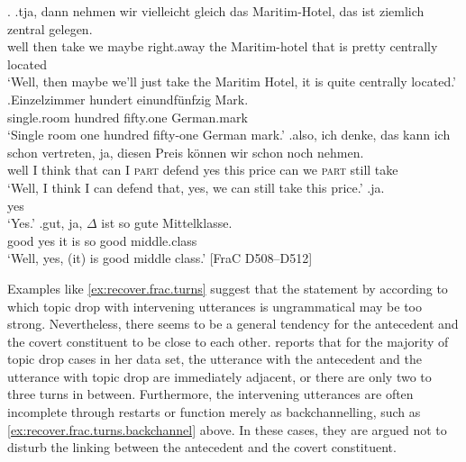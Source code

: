 \ex.\label{ex:recover.frac.turns}
\ag.\label{ex:recover.frac.turns.ant}tja, dann nehmen wir vielleicht gleich das Maritim-Hotel, das ist ziemlich zentral gelegen.\\
well then take we maybe right.away the Maritim-hotel that is pretty centrally located\\
`Well, then maybe we'll just take the Maritim Hotel, it is quite centrally located.'
\bg.Einzelzimmer hundert einundfünfzig Mark.\\
single.room hundred fifty.one German.mark\\
`Single room one hundred fifty-one German mark.'
\cg.\label{ex:recover.frac.turns.price}also, ich denke, das kann ich schon vertreten, ja, diesen Preis können wir schon noch nehmen.\\
well I think that can I \textsc{part} defend yes this price can we \textsc{part} still take\\
`Well, I think I can defend that, yes, we can still take this price.'
\dg.\label{ex:recover.frac.turns.backchannel}ja.\\
yes\\
`Yes.'
\eg.\label{ex:recover.frac.turns.td}gut, ja, $\Delta$ ist so gute Mittelklasse.\\
good yes it is so good middle.class\\
`Well, yes, (it) is good middle class.' [FraC D508--D512]

Examples like \ref{ex:recover.frac.turns} suggest that the statement by \citet{volodina.onea2012} according to which topic drop with intervening utterances is ungrammatical may be too strong.
Nevertheless, there seems to be a general tendency for the antecedent and the covert constituent to be close to each other. 
\citet[90]{helmer2016} reports that for the majority of topic drop cases in her data set, the utterance with the antecedent and the utterance with topic drop are immediately adjacent, or there are only two to three turns in between.
Furthermore, the intervening utterances are often incomplete through restarts or function merely as backchannelling, such as \ref{ex:recover.frac.turns.backchannel} above.
In these cases, they are argued not to disturb the linking between the antecedent and the covert constituent.

